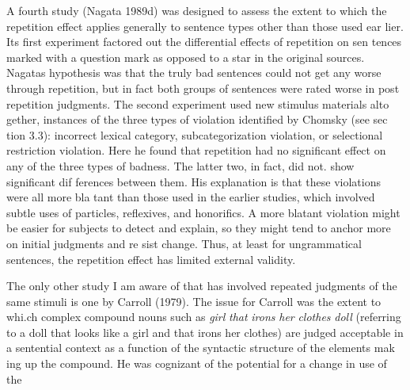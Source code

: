 \begin{styleTextbody}
A fourth study (Nagata 1989d) was designed to assess the extent to which the repetition effect applies generally to sentence types other than those used ear\- lier. Its first experiment factored out the differential effects of repetition on sen\- tences marked with a question mark as opposed to a star in the original sources. Nagata{\textquotesingle}s hypothesis was that the truly bad sentences could not get any worse through repetition, but in fact both groups of sentences were rated worse in post\- repetition judgments. The second experiment used new stimulus materials alto\- gether, instances of the three types of violation identified by Chomsky (see sec\- tion 3.3): incorrect lexical category, subcategorization violation, or selectional restriction violation. Here he found that repetition had no significant effect on any of the three types of badness. The latter two, in fact, did not. show significant dif\- ferences between them. His explanation is that these violations were all more bla\- tant than those used in the earlier studies, which involved subtle uses of particles, reflexives, and honorifics. A more blatant violation might be easier for subjects to detect and explain, so they might tend to anchor more on initial judgments and re\- sist change. Thus, at least for ungrammatical sentences, the repetition effect has limited external validity.
\end{styleTextbody}


\begin{styleTextbody}
The only other study I am aware of that has involved repeated judgments of the same stimuli is one by Carroll (1979). The issue for Carroll was the extent to whi.ch complex compound nouns such as \textit{girl}\textit{ }\textit{that}\textit{ }\textit{irons}\textit{ }\textit{her}\textit{ }\textit{clothes}\textit{ }\textit{doll}\textit{ }(referring to a doll that looks like a girl and that irons her clothes) are judged acceptable in a sentential context as a function of the syntactic structure of the elements mak\- ing up the compound. He was cognizant of the potential for a change in use of the
\end{styleTextbody}


